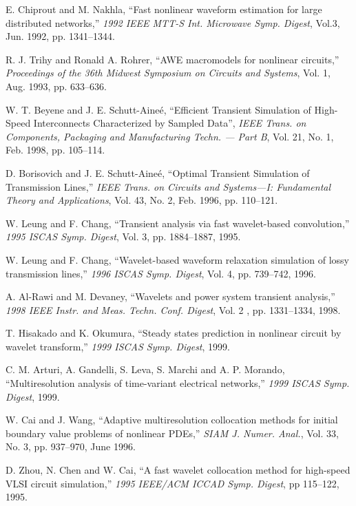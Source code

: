 \begin{thebibliography}{99}
 E. Chiprout and M. Nakhla, ``Fast nonlinear
waveform estimation for large distributed networks,'' \emph{1992 IEEE
MTT-S Int. Microwave Symp. Digest}, Vol.3, Jun. 1992,
pp. 1341--1344.

 R. J. Trihy and Ronald A. Rohrer, ``AWE macromodels
for nonlinear circuits,'' \emph{Proceedings of the 36th Midwest
Symposium on Circuits and Systems}, Vol. 1, Aug. 1993, pp. 633--636.

 W. T. Beyene and J. E. Schutt-Aine\'e, ``Efficient
Transient Simulation of High-Speed Interconnects Characterized by
Sampled Data'', \emph{IEEE Trans. on Components, Packaging and
Manufacturing Techn. --- Part B}, Vol. 21, No. 1, Feb. 1998,
pp. 105--114.

 D. Borisovich and J. E. Schutt-Aine\'e,
``Optimal Transient Simulation of Transmission Lines,'' \emph{IEEE
Trans. on Circuits and Systems---I: Fundamental Theory and
Applications}, Vol. 43, No. 2, Feb. 1996, pp. 110--121.

 W. Leung and F. Chang, ``Transient analysis via
fast wavelet-based convolution,'' \emph{1995 ISCAS Symp. Digest},
Vol. 3, pp. 1884--1887, 1995.

 W. Leung and F. Chang, ``Wavelet-based waveform
relaxation simulation of lossy transmission lines,'' \emph{1996
ISCAS Symp. Digest}, Vol. 4, pp. 739--742, 1996.

 A. Al-Rawi and M. Devaney, ``Wavelets and power
system transient analysis,'' \emph{1998 IEEE Instr. and
Meas. Techn. Conf. Digest}, Vol. 2 , pp. 1331--1334, 1998.

 T. Hisakado and K. Okumura, ``Steady states
prediction in nonlinear circuit by wavelet transform,'' \emph{1999
ISCAS Symp. Digest}, 1999.

 C. M. Arturi, A. Gandelli, S. Leva, S. Marchi and
A. P. Morando, ``Multiresolution analysis of time-variant electrical
networks,'' \emph{1999 ISCAS Symp. Digest}, 1999.

 W. Cai and J. Wang, ``Adaptive multiresolution
collocation methods for initial boundary value problems of nonlinear
PDEs,'' \emph{SIAM J. Numer. Anal.}, Vol. 33, No. 3, pp. 937--970, June
1996.

 D. Zhou, N. Chen and W. Cai, ``A fast wavelet
collocation method for high-speed VLSI circuit simulation,''
\emph{1995 IEEE/ACM ICCAD Symp. Digest}, pp 115--122, 1995.


\end{thebibliography}
